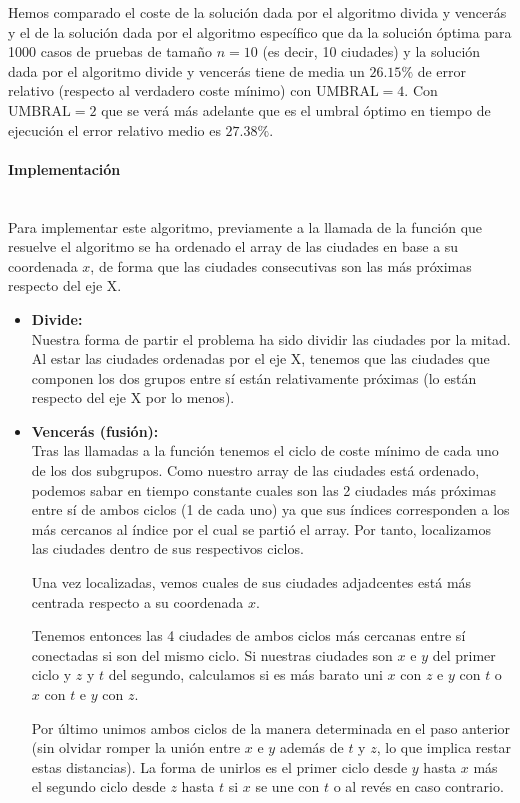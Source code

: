 \documentclass{article}
\newcommand{\myparagraph}[1]{\paragraph{#1}\mbox{}\\}
\begin{document}
Hemos comparado el coste de la solución dada por el algoritmo divida y vencerás y el de la solución dada por el algoritmo específico que da la solución óptima para 1000 casos de pruebas de tamaño $n = 10$ (es decir, 10 ciudades) y la solución dada por el algoritmo divide y vencerás tiene de media un $26.15\%$ de error relativo (respecto al verdadero coste mínimo) con $\text{UMBRAL} = 4$. Con $\text{UMBRAL} = 2$ que se verá más adelante que es el umbral óptimo en tiempo de ejecución el error relativo medio es $27.38\%$.

\myparagraph{Implementación}
Para implementar este algoritmo, previamente a la llamada de la función que resuelve el algoritmo se ha ordenado el array de las ciudades en base a su coordenada $x$, de forma que las ciudades consecutivas son las más próximas respecto del eje X.

\begin{itemize}
    \item \textbf{Divide:}\\
    Nuestra forma de partir el problema ha sido dividir las ciudades por la mitad. Al estar las ciudades ordenadas por el eje X, tenemos que las ciudades que componen los dos grupos entre sí están relativamente próximas (lo están respecto del eje X por lo menos).
    
    \item \textbf{Vencerás (fusión):}\\
    Tras las llamadas a la función tenemos el ciclo de coste mínimo de cada uno de los dos subgrupos. Como nuestro array de las ciudades está ordenado, podemos sabar en tiempo constante cuales son las 2 ciudades más próximas entre sí de ambos ciclos (1 de cada uno) ya que sus índices corresponden a los más cercanos al índice por el cual se partió el array. Por tanto, localizamos las ciudades dentro de sus respectivos ciclos.
    
    Una vez localizadas, vemos cuales de sus ciudades adjadcentes está más centrada respecto a su coordenada $x$.
    
    Tenemos entonces las 4 ciudades de ambos ciclos más cercanas entre sí conectadas si son del mismo ciclo. Si nuestras ciudades son $x$ e $y$ del primer ciclo y $z$ y $t$ del segundo, calculamos si es más barato uni $x$ con $z$ e $y$ con $t$ o $x$ con $t$ e $y$ con $z$.
    
    Por último unimos ambos ciclos de la manera determinada en el paso anterior (sin olvidar romper la unión entre $x$ e $y$ además de $t$ y $z$, lo que implica restar estas distancias). La forma de unirlos es el primer ciclo desde $y$ hasta $x$ más el segundo ciclo desde $z$ hasta $t$ si $x$ se une con $t$ o al revés en caso contrario.
    
\end{itemize}
\end{document}
